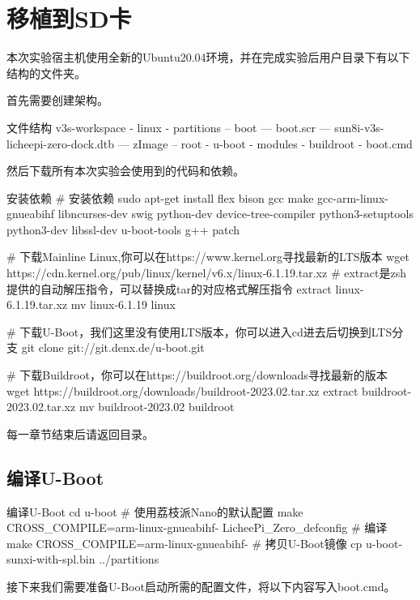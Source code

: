 \documentclass[lang=cn,newtx,10pt,scheme=chinese]{elegantbook}
\begin{document}
\chapter{移植到SD卡}

本次实验宿主机使用全新的Ubuntu20.04环境，并在完成实验后用户目录下有以下结构的文件夹。

首先需要创建架构。

\begin{mycode}{文件结构}
v3s-workspace
- linux
- partitions
-- boot
--- boot.scr
--- sun8i-v3s-licheepi-zero-dock.dtb
--- zImage
-- root
- u-boot
- modules
- buildroot
- boot.cmd
\end{mycode}

然后下载所有本次实验会使用到的代码和依赖。

\begin{mycode}{安装依赖}
# 安装依赖
sudo apt-get install flex bison gcc make gcc-arm-linux-gnueabihf libncurses-dev swig python-dev device-tree-compiler python3-setuptools python3-dev libssl-dev u-boot-tools g++ patch

# 下载Mainline Linux,你可以在https://www.kernel.org寻找最新的LTS版本
wget https://cdn.kernel.org/pub/linux/kernel/v6.x/linux-6.1.19.tar.xz
# extract是zsh提供的自动解压指令，可以替换成tar的对应格式解压指令
extract linux-6.1.19.tar.xz
mv linux-6.1.19 linux

# 下载U-Boot，我们这里没有使用LTS版本，你可以进入cd进去后切换到LTS分支
git clone git://git.denx.de/u-boot.git

# 下载Buildroot，你可以在https://buildroot.org/downloads寻找最新的版本
wget https://buildroot.org/downloads/buildroot-2023.02.tar.xz
extract buildroot-2023.02.tar.xz
mv buildroot-2023.02 buildroot
\end{mycode}

每一章节结束后请返回目录。

\section{编译U-Boot}

\begin{mycode}{编译U-Boot}
cd u-boot
# 使用荔枝派Nano的默认配置
make CROSS_COMPILE=arm-linux-gnueabihf- LicheePi_Zero_defconfig
# 编译
make CROSS_COMPILE=arm-linux-gnueabihf-
# 拷贝U-Boot镜像
cp u-boot-sunxi-with-spl.bin ../partitions
\end{mycode}

接下来我们需要准备U-Boot启动所需的配置文件，将以下内容写入boot.cmd。
\end{document}
